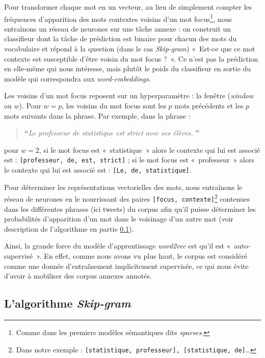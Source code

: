 \documentclass[11pt,french,french]{article}
\let\rmarkdownfootnote\footnote%
\def\footnote{\protect\rmarkdownfootnote}
\begin{document}
Pour transformer chaque mot en un vecteur, au lieu de simplement compter
les fréquences d'apparition des mots contextes voisins d'un mot
focus\footnote{Comme dans les premiers modèles sémantiques dits
  \emph{sparses}.}, nous entraînons un réseau de neurones sur une tâche
annexe : on construit un classifieur dont la tâche de prédiction est
binaire pour chacun des mots du vocabulaire et répond à la question
(dans le cas \emph{Skip-gram}) «~Est-ce que ce mot contexte est
susceptible d'être voisin du mot focus ?~». Ce n'est pas la prédiction
en elle-même qui nous intéresse, mais plutôt le poids du classifieur en
sortie du modèle qui correspondra aux \emph{word-embeddings}.

Les voisins d'un mot focus reposent sur un hyperparamètre : la fenêtre
(\emph{window} ou \(w\)). Pour \(w = p\), les voisins du mot focus sont
les \(p\) mots précédents et les \(p\) mots suivants dans la phrase. Par
exemple, dans la phrase :

\begin{quote}
\LARGE \textbf{``}\normalsize \emph{Le professeur de statistique est strict avec ses élèves.} \LARGE \textbf{''}\normalsize
\end{quote}

pour \(w=2\), si le mot focus est «~statistique~» alors le contexte qui
lui est associé est : \texttt{{[}professeur,\ de,\ est,\ strict{]}} ; si
le mot focus est «~professeur~» alors le contexte qui lui est associé
est : \texttt{{[}Le,\ de,\ statistique{]}}.

Pour déterminer les représentations vectorielles des mots, nous
entraînons le réseau de neurones en le nourrissant des paires
\texttt{{[}focus,\ contexte{]}}\footnote{Dans notre exemple :
  \texttt{{[}statistique,\ professeur{]},\ {[}statistique,\ de{]}}\dots}
contenues dans les différentes phrases (ici tweets) du corpus afin qu'il
puisse déterminer les probabilités d'apparition d'un mot dans le
voisinage d'un autre mot (voir description de l'algorithme en partie
\ref{sec:skipgram}).

Ainsi, la grande force du modèle d'apprentissage \emph{word2vec} est
qu'il est «~auto-supervisé~». En effet, comme nous avons vu plus haut,
le corpus est considéré comme une donnée d'entraînement implicitement
supervisée, ce qui nous évite d'avoir à mobiliser des corpus annexes
annotés.

\subsection{\texorpdfstring{L'algorithme
\emph{Skip-gram}}{L'algorithme Skip-gram}}\label{sec:skipgram}
\end{document}
